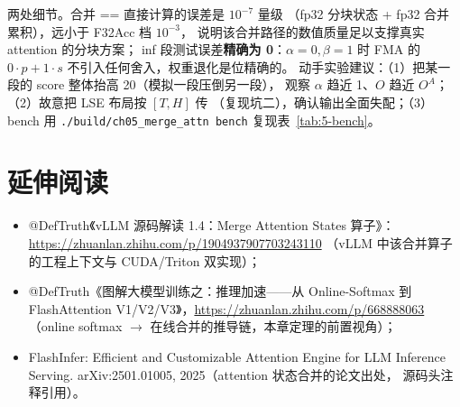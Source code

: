 两处细节。合并 == 直接计算的误差是 $10^{-7}$ 量级
（fp32 分块状态 + fp32 合并累积），远小于 F32Acc 档 $10^{-3}$，
说明该合并路径的数值质量足以支撑真实 attention 的分块方案；
inf 段测试误差\textbf{精确为 0}：$\alpha = 0, \beta = 1$ 时
FMA 的 $0 \cdot p + 1 \cdot s$ 不引入任何舍入，权重退化是位精确的。
动手实验建议：（1）把某一段的 score 整体抬高 20（模拟一段压倒另一段），
观察 $\alpha$ 趋近 1、$O$ 趋近 $O^{A}$；（2）故意把 LSE 布局按 $[T, H]$ 传
（复现坑二），确认输出全面失配；（3）bench 用
\texttt{.\allowbreak{}/\allowbreak{}build/\allowbreak{}ch05\_\allowbreak{}merge\_\allowbreak{}attn bench} 复现表~\ref{tab:5-bench}。

\section*{延伸阅读}

\begin{itemize}
  \item @DefTruth《vLLM 源码解读 1.4：Merge Attention States 算子》：
        \newline \url{https://zhuanlan.zhihu.com/p/1904937907703243110}
        （vLLM 中该合并算子的工程上下文与 CUDA/Triton 双实现）；
  \item @DefTruth《图解大模型训练之：推理加速——从 Online-Softmax 到 FlashAttention
        V1/V2/V3》，\url{https://zhuanlan.zhihu.com/p/668888063}
        （online softmax $\to$ 在线合并的推导链，本章定理的前置视角）；
  \item FlashInfer: Efficient and Customizable Attention Engine for LLM
        Inference Serving. arXiv:2501.01005, 2025（attention 状态合并的论文出处，
        源码头注释引用）。
\end{itemize}
